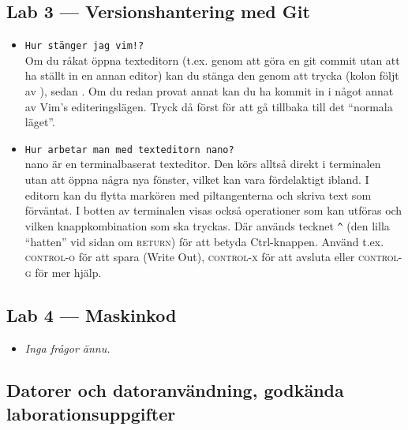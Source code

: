 \documentclass[fleqn, article, a4paper]{memoir}
\newcommand{\commandchar}[1]{\textsc{#1}}
\begin{document}
\subsection{Lab 3 --- Versionshantering med Git}
\begin{itemize}
	\item \texttt{Hur stänger jag vim!?}\\
	      Om du råkat öppna texteditorn  (t.ex. genom att göra en git commit utan att ha ställt in en annan editor) kan du stänga den genom att trycka  (kolon följt av ), sedan . Om du redan provat annat kan du ha kommit in i något annat av Vim's editeringslägen. Tryck då först  för att gå tillbaka till det ``normala läget''.
	\item \texttt{Hur arbetar man med texteditorn nano?} \\
	      nano är en terminalbaserat texteditor. Den körs alltså direkt i terminalen utan att öppna några nya fönster, vilket kan vara fördelaktigt ibland. I editorn kan du flytta markören med piltangenterna och skriva text som förväntat. I botten av terminalen visas också operationer som kan utföras och vilken knappkombination som ska tryckas. Där används tecknet \texttt{\^{}} (den lilla ``hatten'' vid sidan om \commandchar{return}) för att betyda Ctrl-knappen. Använd t.ex. \commandchar{control-o} för att spara (Write Out), \commandchar{control-x} för att avsluta eller \commandchar{control-g} för mer hjälp.
\end{itemize}

\subsection{Lab 4 --- Maskinkod}
\begin{itemize}
	\item \emph{Inga frågor ännu.}
\end{itemize}


\newpage



\newpage



\newpage



\newpage



\newpage

\subsection*{Datorer och datoranvändning, godkända laborationsuppgifter}
\end{document}
